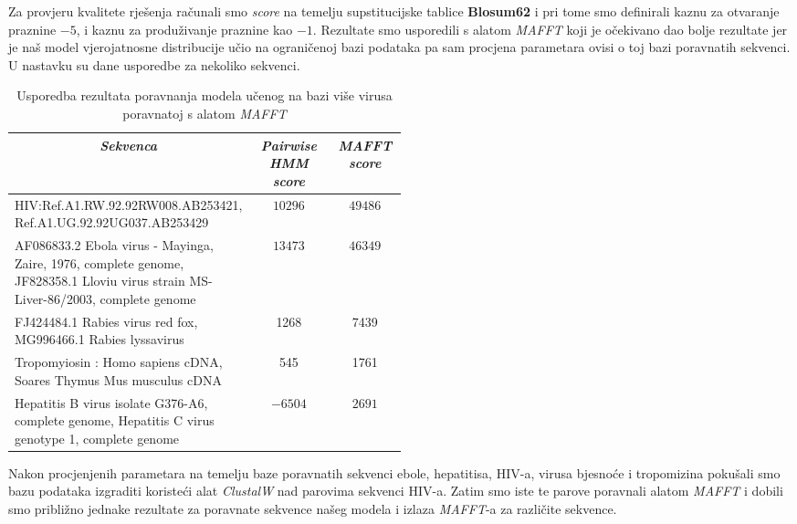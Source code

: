 \documentclass[a4paper]{article}
\begin{document}
Za provjeru kvalitete rješenja računali smo \textit{score} na temelju supstitucijske tablice \textbf{Blosum62} i pri tome smo definirali kaznu za otvaranje praznine $-5$, i kaznu za produživanje praznine kao $-1$. Rezultate smo usporedili s alatom \textit{MAFFT} koji je očekivano dao bolje rezultate jer je naš model vjerojatnosne distribucije učio na ograničenoj bazi podataka pa sam procjena parametara ovisi o toj bazi poravnatih sekvenci. U nastavku su dane usporedbe za nekoliko sekvenci.
\begin{table}[H]
\centering
\begin{tabular}{|p{0.5\linewidth}|c| c|}
\hline
\multicolumn{1}{|c|}{\textit{\textbf{Sekvenca}}} & \multicolumn{1}{c|}{\textit{\textbf{Pairwise HMM score }}} & \multicolumn{1}{c|}{\textit{\textbf{MAFFT score}}}                                      \tabularnewline \hline
HIV:Ref.A1.RW.92.92RW008.AB253421, Ref.A1.UG.92.92UG037.AB253429 & $10296$ & $49486$  \\ \hline
AF086833.2 Ebola virus - Mayinga, Zaire, 1976, complete genome, JF828358.1 Lloviu virus strain MS-Liver-86/2003, complete genome & $13473$ & $46349$ \\ \hline
FJ424484.1 Rabies virus red fox, MG996466.1 Rabies lyssavirus  & 1268 & 7439 \\ \hline
Tropomyiosin : Homo sapiens cDNA, Soares Thymus Mus musculus cDNA & 545 & 1761 \\ \hline
Hepatitis B virus isolate G376-A6, complete genome, Hepatitis C virus genotype 1, complete genome & $-6504$  & $2691$\\ \hline
\end{tabular}
\caption{Usporedba rezultata poravnanja modela učenog na bazi više virusa poravnatoj s alatom \textit{MAFFT}}
\label{table:economicSchools}   
\end{table}
Nakon procjenjenih parametara na temelju baze poravnatih sekvenci ebole, hepatitisa, HIV-a, virusa bjesnoće i  tropomizina pokušali smo bazu podataka izgraditi koristeći alat \textit{ClustalW} nad parovima sekvenci HIV-a. Zatim smo iste te parove poravnali alatom \textit{MAFFT} i dobili smo približno jednake rezultate za poravnate sekvence  našeg modela i izlaza \textit{MAFFT}-a za različite sekvence.\\
\end{document}
